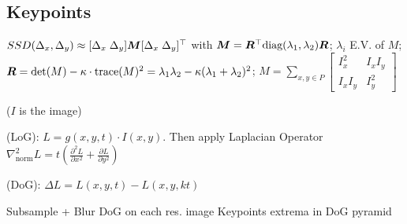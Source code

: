 \subsection{Keypoints}
 $SSD(\Delta_x, \Delta_y) \approx [\Delta_x \; \Delta_y] \bm{M} [\Delta_x \; \Delta_y]^\top$
with $\bm{M} = \bm{R}^\top \text{diag}(\lambda_1, \lambda_2) \bm{R}$; $\lambda_i$ E.V. of $M$;
$\bm{R} = \det(M) - \kappa \cdot \text{trace}(M)^2 = \lambda_1\lambda_2 - \kappa(\lambda_1 + \lambda_2)^2$;
$\displaystyle M = \sum_{x, y \in P} \begin{bmatrix}
        I_x^2   & I_x I_y \\
        I_x I_y & I_y^2
    \end{bmatrix}$


 ($I$ is the image)

 (LoG): $L = g(x, y, t) \cdot I(x, y)$.
Then apply Laplacian Operator $\nabla_\text{norm}^2 L = t\left( \frac{\partial^2 L}{\partial x^2} + \frac{\partial L}{\partial y^2} \right)$

 (DoG): $\Delta L = L(x, y, t) - L(x, y, kt)$

  Subsample + Blur  DoG on each res. image  Keypoints extrema in DoG pyramid
